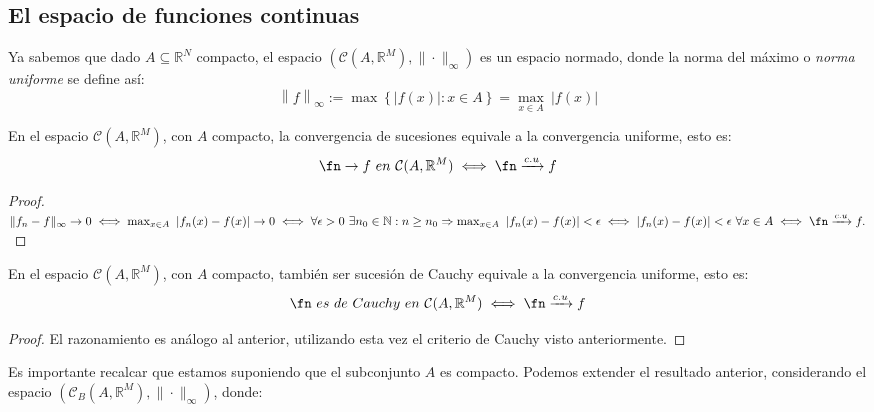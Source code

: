 
\subsection{El espacio de funciones continuas}

Ya sabemos que dado $A\subseteq \mathbb{R}^N$ compacto, el espacio $(\mathcal{C}(A,\mathbb{R}^M), \|\cdot\|_{\infty})$
es un espacio normado, donde la norma del máximo o \textit{norma uniforme} se define así:
$$\left\|f\right\|_{\infty} := \max \left\{ |f(x)|: x \in A \right\} = \max_{x\in A}\ |f(x)|$$

\begin{nprop} En el espacio $\mathcal{C}(A,\mathbb{R}^M)$, con $A$ compacto, la convergencia de sucesiones equivale a la convergencia uniforme, esto es: $$\fn \rightarrow f\ en\ \mathcal{C}(A,\mathbb{R}^M) \iff \fn \xrightarrow {c.u} f$$
\end{nprop}

  \begin{proof} \hfill \\
	  $\|f_n - f \|_{\infty} \rightarrow 0 \iff \max_{x\in A}\ |f_n(x) - f(x)| \rightarrow 0 \iff \forall \epsilon > 0\ \exists n_0 \in \mathbb{N}: n \ge n_0 \Rightarrow \max_{x\in A}  \ |f_n(x) - f(x)| < \epsilon \iff |f_n(x) - f(x)| < \epsilon\  \forall x \in A \iff \fn \xrightarrow {c.u} f.$
  \end{proof}

\begin{nth} \label{3} En el espacio $\mathcal{C}(A,\mathbb{R}^M)$, con $A$ compacto, también ser sucesión de Cauchy equivale a la convergencia uniforme, esto es: $$\fn\ es\ de\ Cauchy\ en\ \mathcal{C}(A,\mathbb{R}^M) \iff \fn \xrightarrow {c.u} f $$
\end{nth}

  \begin{proof} El razonamiento es análogo al anterior, utilizando esta vez el criterio de Cauchy visto anteriormente.
  \end{proof}

Es importante recalcar que estamos suponiendo que el subconjunto $A$ es compacto. Podemos extender el resultado anterior, considerando el espacio $(\mathcal{C}_B(A,\mathbb{R}^M), \|\cdot\|_{\infty})$, donde:

